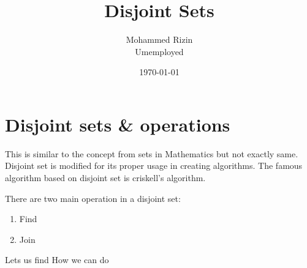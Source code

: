 \documentclass{article}
\title{Disjoint Sets}
\author{Mohammed Rizin \\ Umemployed}
\date{\today}
\begin{document}
\maketitle

\section{Disjoint sets \& operations} 
This is similar to the concept from sets in Mathematics but not exactly same. Disjoint set is modified for its proper usage in creating algorithms. The famous algorithm based on disjoint set is criskell's algorithm.

There are two main operation in a disjoint set:
\begin{enumerate}
\item Find
\item Join
\end{enumerate}

Lets us find How we can do 
\end{document}
